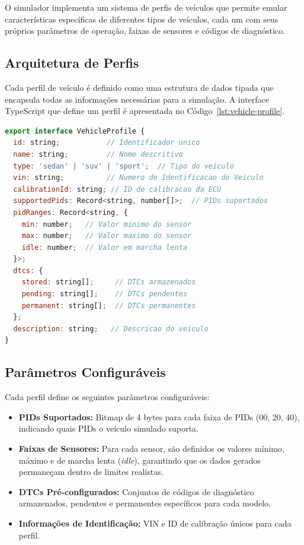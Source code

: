 O simulador implementa um sistema de perfis de veículos que permite emular características específicas de diferentes tipos de veículos, cada um com seus próprios parâmetros de operação, faixas de sensores e códigos de diagnóstico.

\subsection{Arquitetura de Perfis}

Cada perfil de veículo é definido como uma estrutura de dados tipada que encapsula todas as informações necessárias para a simulação. A interface TypeScript que define um perfil é apresentada no Código~\ref{lst:vehicle-profile}.

\begin{lstlisting}[language=JavaScript, caption={Interface TypeScript para perfil de veículo.}, label={lst:vehicle-profile}]
export interface VehicleProfile {
  id: string;           // Identificador unico
  name: string;         // Nome descritivo
  type: 'sedan' | 'suv' | 'sport';  // Tipo do veiculo
  vin: string;          // Numero de Identificacao do Veiculo
  calibrationId: string; // ID de calibracao da ECU
  supportedPids: Record<string, number[]>;  // PIDs suportados
  pidRanges: Record<string, {
    min: number;   // Valor minimo do sensor
    max: number;   // Valor maximo do sensor
    idle: number;  // Valor em marcha lenta
  }>;
  dtcs: {
    stored: string[];     // DTCs armazenados
    pending: string[];    // DTCs pendentes
    permanent: string[];  // DTCs permanentes
  };
  description: string;   // Descricao do veiculo
}
\end{lstlisting}

\subsection{Parâmetros Configuráveis}

Cada perfil define os seguintes parâmetros configuráveis:

\begin{itemize}
    \item \textbf{PIDs Suportados:} Bitmap de 4 bytes para cada faixa de PIDs (00, 20, 40), indicando quais PIDs o veículo simulado suporta.
    \item \textbf{Faixas de Sensores:} Para cada sensor, são definidos os valores mínimo, máximo e de marcha lenta (\textit{idle}), garantindo que os dados gerados permaneçam dentro de limites realistas.
    \item \textbf{DTCs Pré-configurados:} Conjuntos de códigos de diagnóstico armazenados, pendentes e permanentes específicos para cada modelo.
    \item \textbf{Informações de Identificação:} VIN e ID de calibração únicos para cada perfil.
\end{itemize}

